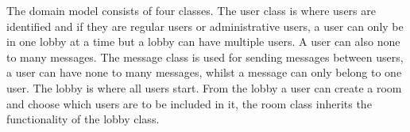 The domain model consists of four classes. The user class is where users are identified and if they are regular users or administrative users, a user can only be in one lobby at a time but a lobby can have multiple users. A user can also none to many messages. The message class is used for sending messages between users, a user can have none to many messages, whilst a message can only belong to one user. The lobby is where all users start. From the lobby a user can create a room and choose which users are to be included in it, the room class inherits the functionality of the lobby class.
